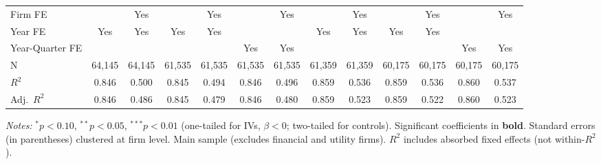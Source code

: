 \documentclass[11pt,a4paper]{article}
\begin{document}
\begin{table}[htbp]
\begin{tabular}{lcccccccccccc}
Firm FE &  & Yes &  & Yes &  & Yes &  & Yes &  & Yes &  & Yes \\
Year FE & Yes & Yes & Yes & Yes &  &  & Yes & Yes & Yes & Yes &  &  \\
Year-Quarter FE &  &  &  &  & Yes & Yes &  &  &  &  & Yes & Yes \\
\midrule
N & 64,145 & 64,145 & 61,535 & 61,535 & 61,535 & 61,535 & 61,359 & 61,359 & 60,175 & 60,175 & 60,175 & 60,175 \\
$R^2$ & 0.846 & 0.500 & 0.845 & 0.494 & 0.846 & 0.496 & 0.859 & 0.536 & 0.859 & 0.536 & 0.860 & 0.537 \\
Adj.~$R^2$ & 0.846 & 0.486 & 0.845 & 0.479 & 0.846 & 0.480 & 0.859 & 0.523 & 0.859 & 0.522 & 0.860 & 0.523 \\
\bottomrule
\end{tabular}
\begin{minipage}{\linewidth}
\vspace{2pt}\scriptsize
\textit{Notes:} $^{*}p<0.10$, $^{**}p<0.05$, $^{***}p<0.01$ (one-tailed for IVs, $\beta < 0$; two-tailed for controls).
 Significant coefficients in \textbf{bold}.
 Standard errors (in parentheses) clustered at firm level.
 Main sample (excludes financial and utility firms).
 $R^2$ includes absorbed fixed effects (not within-$R^2$).
\end{minipage}
\end{table}
\clearpage
\end{document}

